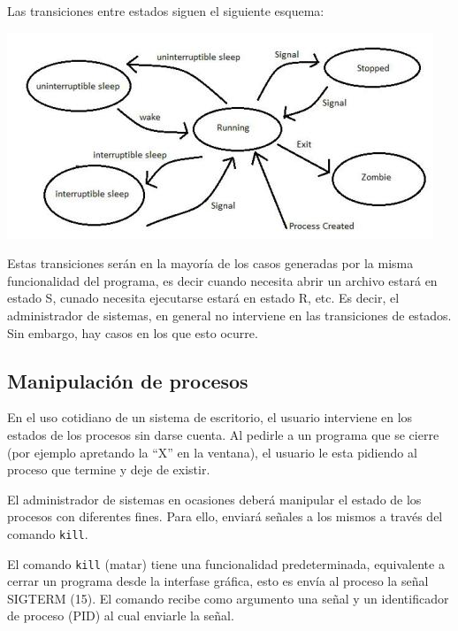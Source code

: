 \documentclass[12pt]{article}
\begin{document}
Las transiciones entre estados siguen el siguiente esquema: 

\begin{center}
\includegraphics{process-states-s.jpg}
\end{center}
 
Estas transiciones serán en la mayoría de los casos generadas por la misma
funcionalidad del programa, es decir cuando necesita abrir un archivo
estará en estado S, cunado necesita ejecutarse estará en estado R, etc. 
Es decir, el administrador de sistemas, en general no interviene en las
transiciones de estados. Sin embargo, hay casos en los que esto ocurre. 

\subsection*{Manipulación de procesos}

En el uso cotidiano de un sistema de escritorio, el usuario interviene 
en los estados de los procesos sin darse cuenta. Al pedirle a un programa
que se cierre (por ejemplo apretando la ``X'' en la ventana), el usuario
le esta pidiendo al proceso que termine y deje de existir. 

El administrador de sistemas en ocasiones deberá manipular el estado de 
los procesos con diferentes fines. Para ello, enviará señales a los 
mismos a través del comando \texttt{kill}. 


El comando \texttt{kill} (matar) tiene una funcionalidad predeterminada, 
equivalente a cerrar un programa desde la interfase gráfica, esto es envía
al proceso la señal SIGTERM (15). El comando 
recibe como argumento una señal y un identificador de proceso (PID) al 
cual enviarle la señal. 
\end{document}
